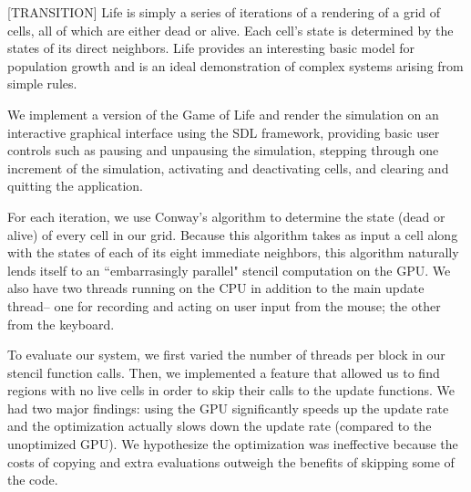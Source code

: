 \documentclass[12pt]{article}
\begin{document}
	[TRANSITION] Life is simply a series of iterations of a rendering of a grid of cells, all of which are either dead or alive. Each cell's state is determined by the states of its direct neighbors. Life provides an interesting basic model for population growth and is an ideal demonstration of complex systems arising from simple rules. 

        We implement a version of the Game of Life and render the simulation on
        an interactive graphical interface using the SDL framework, providing
        basic user controls such as pausing and unpausing the simulation,
        stepping through one increment of the simulation, activating and
        deactivating cells, and clearing and quitting the application.
	
	For each iteration, we use Conway's algorithm to determine the state (dead or alive) of every cell in our grid. Because this algorithm takes as input a cell along with the states of each of its eight immediate neighbors, this algorithm naturally lends itself to an ``embarrasingly parallel" stencil computation on the GPU. We also have two threads running on the CPU in addition to the main update thread-- one for recording and acting on user input from the mouse; the other from the keyboard. 
	
	To evaluate our system, we first varied the number of threads per block in our stencil function calls. Then, we implemented a feature that allowed us to find regions with no live cells in order to skip their calls to the update functions.
We had two major findings: using the GPU significantly speeds up the update rate and the optimization actually slows down the update rate (compared to the unoptimized GPU). We hypothesize the optimization was ineffective because the costs of copying and extra evaluations outweigh the benefits of skipping some of the code.
\end{document}
